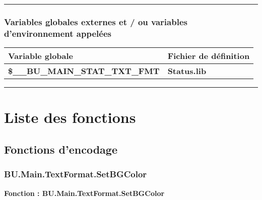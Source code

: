 \documentclass[a4paper,10pt]{article}
\begin{document}
    \color{sec3}\par\noindent\rule{\textwidth}{0.4pt}\color{text}\setlength{\parskip}{1em}

    \color{sec3}
    \subsubsection{Variables globales externes et / ou variables d'environnement appelées}\color{text}

    \begin{justify}
        \begin{tabular}{|l|l|}
            \hline
            \textbf{Variable globale}                           & \textbf{Fichier de définition}\\
            \hline
            \textbf{\color{vars}\$\_\_BU\_MAIN\_STAT\_TXT\_FMT} & \textbf{\color{path}Status.lib}\\
            \hline
        \end{tabular}
    \end{justify}

    \setlength{\parskip}{2em}





    \color{sec1}\par\noindent\rule{\textwidth}{0.4pt}\color{text}

    \color{sec1}
    \section{Liste des fonctions}\color{text}

    \color{sec2}
    \subsection{Fonctions d'encodage}\color{text}

    \color{sec3}
    \subsubsection{BU.Main.TextFormat.SetBGColor}\color{text}

    \begin{justify}
        \textbf{Fonction : \color{func}BU.Main.TextFormat.SetBGColor}
    \end{justify}
\end{document}
